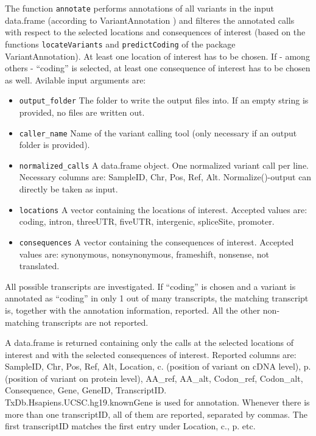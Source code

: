\documentclass{article}
\begin{document}
The function \texttt{annotate} performs annotations of all variants in the input data.frame (according to VariantAnnotation \cite{va}) and filteres the annotated calls with respect to the selected locations and consequences of interest (based on the functions \texttt{locateVariants} and \texttt{predictCoding} of the package VariantAnnotation). At least one location of interest has to be chosen. If - among others - ``coding'' is selected, at least one consequence of interest has to be chosen as well. Avilable input arguments are:

\begin{itemize}
\item \texttt{output\_folder} The folder to write the output files into. If an empty string is provided, no files are written out.
  \item \texttt{caller\_name} Name of the variant calling tool (only necessary if an output folder is provided).
  \item \texttt{normalized\_calls} A data.frame object. One normalized variant call per line. Necessary columns are: SampleID, Chr, Pos, Ref, Alt. Normalize()-output can directly be taken as input.
  \item \texttt{locations} A vector containing the locations of interest. Accepted values are: coding, intron, threeUTR, fiveUTR, intergenic, spliceSite, promoter.
  \item \texttt{consequences} A vector containing the consequences of interest. Accepted values are: synonymous, nonsynonymous, frameshift, nonsense, not translated.
\end{itemize}

All possible transcripts are investigated. If ``coding'' is chosen and a variant is annotated as ``coding'' in only 1 out of many transcripts, the matching transcript is, together with the annotation information, reported. All the other non-matching transcripts are not reported.

A data.frame is returned containing only the calls at the selected locations of interest and with the selected consequences of interest. Reported columns are: SampleID, Chr, Pos, Ref, Alt, Location, c. (position of variant on cDNA level), p. (position of variant on protein level), AA\_ref, AA\_alt, Codon\_ref, Codon\_alt, Consequence, Gene, GeneID, TranscriptID. TxDb.Hsapiens.UCSC.hg19.knownGene is used for annotation. Whenever there is more than one transcriptID, all of them are reported, separated by commas. The first transcriptID matches the first entry under Location, c., p. etc.
\end{document}
